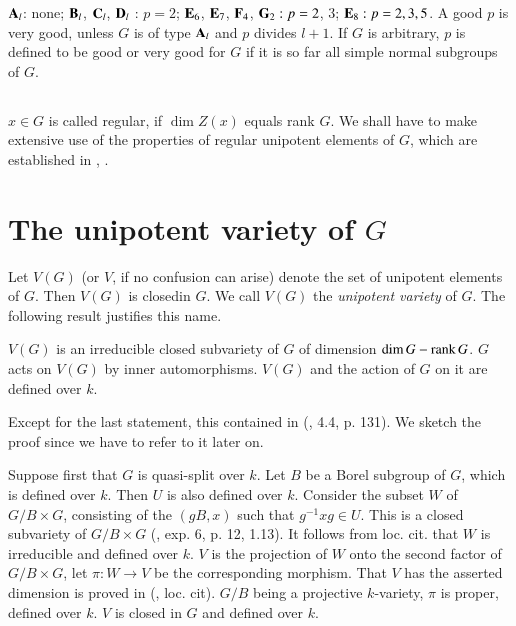 $\mathbf{A}_{l}$: none; $\mathbf{B}_{l}$, $\mathbf{C}_{l}$, $\mathbf{D}_{l}$ : $p=2$; $\mathbf{E}_{6}$, $\mathbf{E}_{7}$, $\mathbf{F}_{4}$, $\mathbf{G}_{2} : p = 2$, $3$; $\mathbf{E}_{8} : p=2,3,5$. A good $p$ is very good, unless $G$ is of type $\mathbf{A}_{l}$ and $p$ divides $l+1$. If $G$ is arbitrary, $p$ is defined to be good or very good for $G$ if it is so far all simple normal subgroups of $G$.

\subsection{}\label{art19-sec0.4}
$x\in G$ is called regular, if $\dim Z(x)$ equals rank $G$. We shall have to make extensive use of the properties of regular unipotent elements of $G$, which are established in \cite{art19-key14}, \cite{art19-key15}.

\section{The unipotent variety of \texorpdfstring{$G$}{G}}\label{art19-sec1}

Let $V(G)$ (or $V$, if no confusion can arise) denote the set of unipotent elements of $G$. Then $V(G)$ is closed\pageoriginale in $G$. We call $V(G)$ the {\em unipotent variety} of $G$. The following result justifies this name.

\begin{proposition}\label{art19-prop1.1}
$V(G)$ is an irreducible closed subvariety of $G$ of dimension $\dim G - \operatorname{\mathrm{rank}} G$. $G$ acts on $V(G)$ by inner automorphisms. $V(G)$ and the action of $G$ on it are defined over $k$.
\end{proposition}

Except for the last statement, this contained in (\cite{art19-key14}, 4.4, p. 131). We sketch the proof since we have to refer to it later on.

Suppose first that $G$ is quasi-split over $k$. Let $B$ be a Borel subgroup of $G$, which is defined over $k$. Then $U$ is also defined over $k$. Consider the subset $W$ of $G/B\times G$, consisting of the $(gB,x)$ such that $g^{-1}xg\in U$. This is a closed subvariety of $G/B\times G$ (\cite{art19-key5}, exp. 6, p. 12, 1.13). It follows from loc. cit. that $W$ is irreducible and defined over $k$. $V$ is the projection of $W$ onto the second factor of $G/B\times G$, let $\pi :W\to V$ be the corresponding morphism. That $V$ has the asserted dimension is proved in (\cite{art19-key14}, loc. cit). $G/B$ being a projective $k$-variety, $\pi$ is proper, defined over $k$. $V$ is closed in $G$ and defined over $k$.

